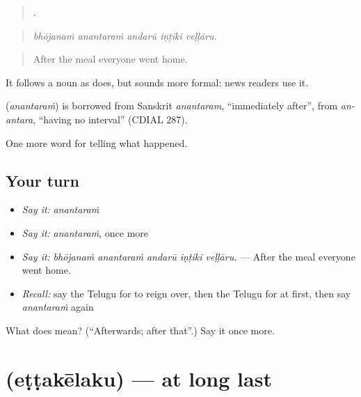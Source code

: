 \begin{quote}
    .
\end{quote}

\begin{quote}
\emph{bhōjanaṁ anantaraṁ andarū iṇṭiki veḷḷāru.}
\end{quote}

\begin{quote}
After the meal everyone went home.
\end{quote}

It follows a noun as  does, but sounds more formal: news readers use it.

\begin{cousinweb}
\textbf{} (\emph{anantaraṁ}) is borrowed from Sanskrit \emph{anantaram}, \textquotedblleft{}immediately after\textquotedblright{}, from \emph{an-antara}, \textquotedblleft{}having no interval\textquotedblright{} (CDIAL 287).
\end{cousinweb}

\begin{grammarlens}[title={What you've built}]
One more word for telling what happened.
\end{grammarlens}

\subsection*{Your turn}
\begin{itemize}
\raggedright
  \item \emph{Say it:} \emph{anantaraṁ}
  \item \emph{Say it:} \emph{anantaraṁ}, once more
  \item \emph{Say it:} \emph{bhōjanaṁ anantaraṁ andarū iṇṭiki veḷḷāru.} — After the meal everyone went home.
  \item \emph{Recall:} say the Telugu for to reign over, then the Telugu for at first, then say \emph{anantaraṁ} again
\end{itemize}

\begin{tcolorbox}[breakable,colback=teal!4,colframe=teal!35!black,title={Before you move on}]
What does  mean? (\textquotedblleft{}Afterwards; after that\textquotedblright{}.) Say it once more.
\end{tcolorbox}
\section[\texorpdfstring{\te{ఎట్టకేలకు} (eṭṭakēlaku)}{ఎట్టకేలకు (eṭṭakēlaku)}]{ (eṭṭakēlaku) — at long last}

